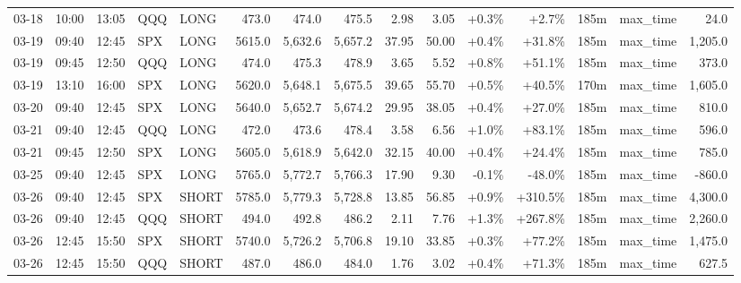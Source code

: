 \documentclass[11pt,a4paper,twoside]{article}
\begin{document}
\begin{landscape}
\begin{center}
\begin{longtable}{>{\color{txtmain}}l l l l l r r r r r r r r >{\color{txtmain}}l r}
03-18 & 10:00 & 13:05 & QQQ & LONG & 473.0 & 474.0 & 475.5 & 2.98 & 3.05 & \textcolor{wingreen}{+0.3\%} & \textcolor{wingreen}{+2.7\%} & 185m & max\_time & \textcolor{wingreen}{24.0} \\
03-19 & 09:40 & 12:45 & SPX & LONG & 5615.0 & 5,632.6 & 5,657.2 & 37.95 & 50.00 & \textcolor{wingreen}{+0.4\%} & \textcolor{wingreen}{+31.8\%} & 185m & max\_time & \textcolor{wingreen}{1,205.0} \\
03-19 & 09:45 & 12:50 & QQQ & LONG & 474.0 & 475.3 & 478.9 & 3.65 & 5.52 & \textcolor{wingreen}{+0.8\%} & \textcolor{wingreen}{+51.1\%} & 185m & max\_time & \textcolor{wingreen}{373.0} \\
03-19 & 13:10 & 16:00 & SPX & LONG & 5620.0 & 5,648.1 & 5,675.5 & 39.65 & 55.70 & \textcolor{wingreen}{+0.5\%} & \textcolor{wingreen}{+40.5\%} & 170m & max\_time & \textcolor{wingreen}{1,605.0} \\
03-20 & 09:40 & 12:45 & SPX & LONG & 5640.0 & 5,652.7 & 5,674.2 & 29.95 & 38.05 & \textcolor{wingreen}{+0.4\%} & \textcolor{wingreen}{+27.0\%} & 185m & max\_time & \textcolor{wingreen}{810.0} \\
03-21 & 09:40 & 12:45 & QQQ & LONG & 472.0 & 473.6 & 478.4 & 3.58 & 6.56 & \textcolor{wingreen}{+1.0\%} & \textcolor{wingreen}{+83.1\%} & 185m & max\_time & \textcolor{wingreen}{596.0} \\
03-21 & 09:45 & 12:50 & SPX & LONG & 5605.0 & 5,618.9 & 5,642.0 & 32.15 & 40.00 & \textcolor{wingreen}{+0.4\%} & \textcolor{wingreen}{+24.4\%} & 185m & max\_time & \textcolor{wingreen}{785.0} \\
03-25 & 09:40 & 12:45 & SPX & LONG & 5765.0 & 5,772.7 & 5,766.3 & 17.90 & 9.30 & \textcolor{lossred}{-0.1\%} & \textcolor{lossred}{-48.0\%} & 185m & max\_time & \textcolor{lossred}{-860.0} \\
03-26 & 09:40 & 12:45 & SPX & SHORT & 5785.0 & 5,779.3 & 5,728.8 & 13.85 & 56.85 & \textcolor{wingreen}{+0.9\%} & \textcolor{wingreen}{+310.5\%} & 185m & max\_time & \textcolor{wingreen}{4,300.0} \\
03-26 & 09:40 & 12:45 & QQQ & SHORT & 494.0 & 492.8 & 486.2 & 2.11 & 7.76 & \textcolor{wingreen}{+1.3\%} & \textcolor{wingreen}{+267.8\%} & 185m & max\_time & \textcolor{wingreen}{2,260.0} \\
03-26 & 12:45 & 15:50 & SPX & SHORT & 5740.0 & 5,726.2 & 5,706.8 & 19.10 & 33.85 & \textcolor{wingreen}{+0.3\%} & \textcolor{wingreen}{+77.2\%} & 185m & max\_time & \textcolor{wingreen}{1,475.0} \\
03-26 & 12:45 & 15:50 & QQQ & SHORT & 487.0 & 486.0 & 484.0 & 1.76 & 3.02 & \textcolor{wingreen}{+0.4\%} & \textcolor{wingreen}{+71.3\%} & 185m & max\_time & \textcolor{wingreen}{627.5} \\

\end{longtable}
\end{center}
\end{landscape}
\end{document}
